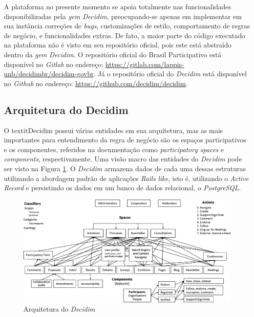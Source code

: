 A plataforma no presente momento se apoia totalmente nas funcionalidades disponibilizadas pela \textit{gem Decidim}, preocupando-se apenas em implementar em sua instância correções de \textit{bugs}, customizações de estilo, comportamento de regras de negócio, e funcionalidades extras. De fato, a maior parte do código executado na plataforma não é visto em seu repositório oficial, pois este está abstraído dentro da \textit{gem Decidim}. O repositório oficial do Brasil Participativo está disponível no \textit{Gitlab} no endereço: \href{https://gitlab.com/lappis-unb/decidimbr/decidim-govbr}{https://gitlab.com/lappis-unb/decidimbr/decidim-govbr}. Já o repositório oficial do \textit{Decidim} está disponível no \textit{Github} no endereço: \href{https://github.com/decidim/decidim}{https://github.com/decidim/decidim}.


\subsection{Arquitetura do Decidim}

O textit{Decidim} possui várias entidades em sua arquitetura, mas as mais importantes para entendimento da regra de negócio são os espaços participativos e os componentes, referidos na documentação como \textit{participatory spaces} e \textit{components}, respectivamente. Uma visão macro das entidades do \textit{Decidim} pode ser visto na Figura \ref{fig:arquitetura-decidim}. O \textit{Decidim} armazena dados de cada uma dessas estruturas utilizando a abordagem padrão de aplicações \textit{Rails like}, isto é, utilizando o \textit{Active Record} e persistindo os dados em um banco de dados relacional, o \textit{PostgreSQL}.

\begin{figure}[htbp]
  \centering
  \caption{Arquitetura do \textit{Decidim}}
  \label{fig:arquitetura-decidim}
  \includegraphics[width=\textwidth]{figuras/diagrama_decidim-min.eps}
\end{figure}

